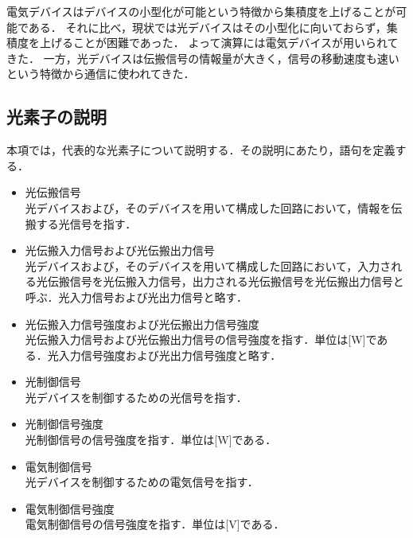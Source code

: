 電気デバイスはデバイスの小型化が可能という特徴から集積度を上げることが可能である．
それに比べ，現状では光デバイスはその小型化に向いておらず，集積度を上げることが困難であった．
よって演算には電気デバイスが用いられてきた．
一方，光デバイスは伝搬信号の情報量が大きく，信号の移動速度も速いという特徴から通信に使われてきた．

\subsection{光素子の説明}
本項では，代表的な光素子について説明する．その説明にあたり，語句を定義する．
\begin{itemize}
\item 光伝搬信号\\
光デバイスおよび，そのデバイスを用いて構成した回路において，情報を伝搬する光信号を指す．
\item 光伝搬入力信号および光伝搬出力信号\\
光デバイスおよび，そのデバイスを用いて構成した回路において，入力される光伝搬信号を光伝搬入力信号，出力される光伝搬信号を光伝搬出力信号と呼ぶ．光入力信号および光出力信号と略す．
\item 光伝搬入力信号強度および光伝搬出力信号強度\\
光伝搬入力信号および光伝搬出力信号の信号強度を指す．単位は[W]である．光入力信号強度および光出力信号強度と略す．
\item 光制御信号\\
光デバイスを制御するための光信号を指す．
\item 光制御信号強度\\
光制御信号の信号強度を指す．単位は[W]である．
\item 電気制御信号\\
光デバイスを制御するための電気信号を指す．
\item 電気制御信号強度\\
電気制御信号の信号強度を指す．単位は[V]である．
\end{itemize}

